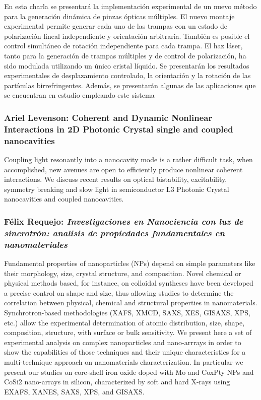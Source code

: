 En esta charla se presentar\'a la implementaci\'on experimental de un nuevo
m\'etodo para la generaci\'on din\'amica de pinzas \'opticas m\'ultiples. El
nuevo montaje experimental permite generar cada uno de las trampas con un estado
de polarizaci\'on lineal independiente y orientaci\'on arbitraria. Tambi\'en es
posible el control simult\'aneo de rotaci\'on independiente para cada trampa. El
haz l\'aser, tanto para la generaci\'on de trampas  m\'ultiples y de control de
polarizaci\'on, ha sido modulada utilizando un \'unico cristal l\'iquido. Se
presentar\'an los resultados experimentales de desplazamiento controlado, la
orientaci\'on y la rotaci\'on de las part\'iculas birrefringentes. Adem\'as, se
presentar\'an algunas de las aplicaciones que se encuentran en estudio empleando
este sistema

\subsubsection*{Ariel Levenson: Coherent and Dynamic Nonlinear Interactions in
2D Photonic Crystal single and coupled nanocavities}

Coupling light resonantly into a nanocavity mode is a
rather difficult task, when accomplished, new avenues are open to
efficiently produce nonlinear coherent interactions. We discuss recent
results on optical bistability, excitability, symmetry breaking and
slow light in semiconductor L3 Photonic Crystal nanocavities and
coupled nanocavities.

\subsubsection*{F\'elix Requejo: \textit{Investigaciones en Nanociencia con luz
de sincrotr\'on: analisis de propiedades fundamentales en nanomateriales}}

Fundamental properties of nanoparticles (NPs) depend on simple parameters like
their morphology, size, crystal structure, and composition. Novel chemical or
physical methods based, for instance, on colloidal syntheses have been developed
a precise control on shape and size, thus allowing studies to determine the
correlation between physical, chemical and structural properties in
nanomaterials. Synchrotron-based methodologies (XAFS, XMCD, SAXS, XES, GISAXS,
XPS, etc.) allow the experimental determination of atomic distribution, size,
shape, composition, structure, with surface or bulk sensitivity. We present here
a set of experimental analysis on complex nanoparticles and nano-arrrays in
order to show the capabilities of those techniques and their unique
characteristics for a multi-technique approach on nanomaterials
characterization. In particular we present our studies on core-shell iron oxide
doped with Mo and CoxPty NPs and CoSi2 nano-arrays in silicon, characterized by
soft and hard X-rays using EXAFS, XANES, SAXS, XPS, and GISAXS.
